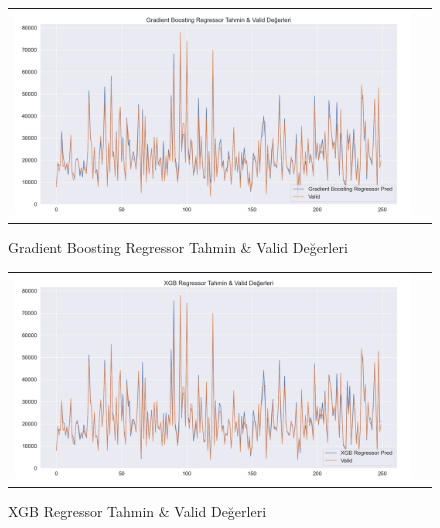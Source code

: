 \documentclass[conference]{IEEEtran}
\begin{document}
\begin{figure}[!h]
	\centering
	\begin{center}
		\begin{tabular}{cc}
			\includegraphics[scale=0.2]{pictures/pic_18.png}&
		\end{tabular}
	\end{center}
	\caption{Gradient Boosting Regressor Tahmin \& Valid Değerleri}
	\label{fig:18}
\end{figure}
\pagebreak
\begin{figure}[!h]
	\centering
	\begin{center}
		\begin{tabular}{cc}
			\includegraphics[scale=0.18]{pictures/pic_19.png}&
		\end{tabular}
	\end{center}
	\caption{XGB Regressor Tahmin \& Valid Değerleri}
	\label{fig:19}
\end{figure}
\end{document}
